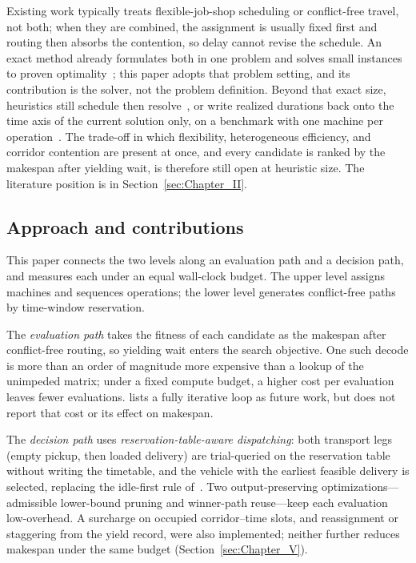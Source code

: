 \documentclass[manuscript,screen,review]{acmart}
\begin{document}
Existing work typically treats flexible-job-shop scheduling or conflict-free travel, not both; when they are combined, the assignment is usually fixed first and routing then absorbs the contention, so delay cannot revise the schedule.
An exact method already formulates both in one problem and solves small instances to proven optimality~\cite{vanos2026exact}; this paper adopts that problem setting, and its contribution is the solver, not the problem definition.
Beyond that exact size, heuristics still schedule then resolve~\cite{sun2023integrated}, or write realized durations back onto the time axis of the current solution only, on a benchmark with one machine per operation~\cite{li2026framework}.
The trade-off in which flexibility, heterogeneous efficiency, and corridor contention are present at once, and every candidate is ranked by the makespan after yielding wait, is therefore still open at heuristic size.
The literature position is in Section~\ref{sec:Chapter_II}.

\subsection{Approach and contributions}

This paper connects the two levels along an evaluation path and a decision path, and measures each under an equal wall-clock budget.
The upper level assigns machines and sequences operations; the lower level generates conflict-free paths by time-window reservation.

The \emph{evaluation path} takes the fitness of each candidate as the makespan after conflict-free routing, so yielding wait enters the search objective.
One such decode is more than an order of magnitude more expensive than a lookup of the unimpeded matrix; under a fixed compute budget, a higher cost per evaluation leaves fewer evaluations.
\cite{li2026framework} lists a fully iterative loop as future work, but does not report that cost or its effect on makespan.

The \emph{decision path} uses \emph{reservation-table-aware dispatching}: both transport legs (empty pickup, then loaded delivery) are trial-queried on the reservation table without writing the timetable, and the vehicle with the earliest feasible delivery is selected, replacing the idle-first rule of~\cite{li2026framework}.
Two output-preserving optimizations---admissible lower-bound pruning and winner-path reuse---keep each evaluation low-overhead.
A surcharge on occupied corridor--time slots, and reassignment or staggering from the yield record, were also implemented; neither further reduces makespan under the same budget (Section~\ref{sec:Chapter_V}).
\end{document}
